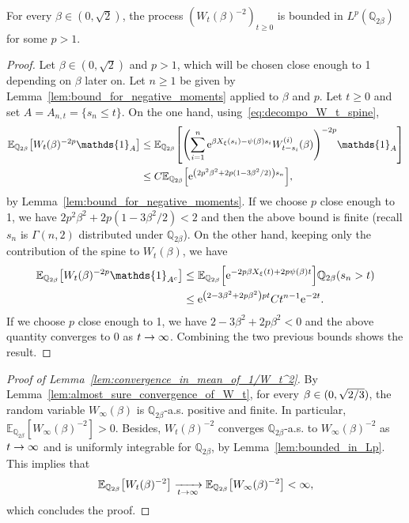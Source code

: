\documentclass[AHL,Unicode,longabstracts,published]{cedram}
\newcommand{\e}{\mathrm{e}}
\newcommand{\E}{\mathbb{E}}
\newcommand{\Q}{\mathbb{Q}}
\newcommand\1{\mathds{1}}
\let\originalleft\left
\let\originalright\right
\renewcommand{\left}{\mathopen{}\mathclose\bgroup\originalleft}
\renewcommand{\right}{\aftergroup\egroup\originalright}
\renewcommand*{\to}{\mathchoice{\longrightarrow}{\rightarrow}{\rightarrow}{\rightarrow}}
\begin{document}
\begin{lemm}\label{lem:bounded_in_Lp}
For every $\beta \in (0, \sqrt{2})$, the process $(W_t(\beta)^{-2})_{t \geq 0}$ is bounded in $L^p(\Q_{2\beta})$ for some $p > 1$.
\end{lemm}


\begin{proof}
Let $\beta \in (0, \sqrt{2})$ and $p > 1$, which will be chosen close enough to 1 depending on $\beta$ later on. Let $n \geq 1$ be given by Lemma~\ref{lem:bound_for_negative_moments} applied to $\beta$ and $p$. Let $t \geq 0$ and set $A = A_{n, t} = \{s_n \leq t\}$. On the one hand, using~\eqref{eq:decompo_W_t_spine},
\begin{align*}
\E_{\Q_{2\beta}} \left[W_t(\beta)^{-2p} \1_A \right] &\leq \E_{\Q_{2\beta}} \left[\left(\sum_{i = 1}^n \e^{\beta X_\xi(s_i) - \psi(\beta)s_i} W_{t - s_i}^{(i)}(\beta) \right)^{-2p} \1_A \right]\\
&\leq C \E_{\Q_{2\beta}} \left[\e^{\left(2p^2\beta^2 + 2p(1 - 3\beta^2/2)\right) s_n} \right],
\end{align*}
by Lemma~\ref{lem:bound_for_negative_moments}. If we choose $p$ close enough to 1, we have $2p^2\beta^2 + 2p(1 - 3\beta^2/2) < 2$ and then the above bound is finite (recall $s_n$ is $\Gamma(n,2)$ distributed under $\Q_{2\beta}$). On the other hand, keeping only the contribution of the spine to $W_t(\beta)$, we have
\begin{align*}
\E_{\Q_{2\beta}} \left[W_t(\beta)^{-2p} \1_{A^c} \right] &\leq \E_{\Q_{2\beta}} \left[\e^{-2p \beta X_\xi(t) + 2p \psi(\beta)t} \right] \Q_{2\beta}(s_n > t)\\
&\leq \e^{\left(2 - 3\beta^2 + 2p\beta^2\right)pt} C t^{n-1} \e^{-2t}.
\end{align*}
If we choose $p$ close enough to 1, we have $2 - 3\beta^2 + 2p\beta^2 < 0$ and the above quantity converges to $0$ as $t \to \infty$. Combining the two previous bounds shows the result.
\end{proof}

\begin{proof}[Proof of Lemma~\ref{lem:convergence_in_mean_of_1/W_t^2}]
By Lemma~\ref{lem:almost_sure_convergence_of_W_t}, for every $\beta \in (0, \sqrt{2\smash{/}3})$, the random variable $W_\infty(\beta)$ is $\Q_{2\beta}$-a.s. positive and finite. In particular, $\E_{\Q_{2\beta}}[W_\infty(\beta)^{-2}] > 0$. Besides, $W_t(\beta)^{-2}$ converges $\Q_{2\beta}$-a.s. to $W_\infty(\beta)^{-2}$ as $t \to \infty$ and is uniformly integrable for $\Q_{2\beta}$, by Lemma~\ref{lem:bounded_in_Lp}. This implies that
\begin{equation*}
\E_{\Q_{2\beta}}\left[W_t(\beta)^{-2}\right] \xrightarrow[t \to \infty]{} \E_{\Q_{2\beta}}\left[W_\infty(\beta)^{-2}\right] < \infty,
\end{equation*}
which concludes the proof.
\end{proof}
\end{document}
